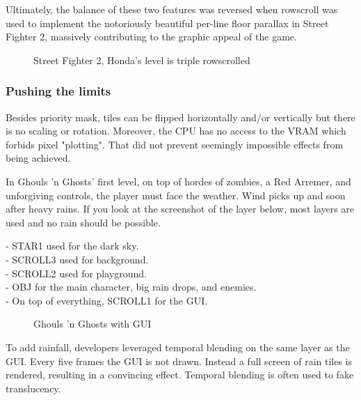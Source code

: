 Ultimately, the balance of these two features was reversed when rowscroll was used to implement the notoriously beautiful per-line floor parallax in Street Fighter 2, massively contributing to the graphic appeal of the game.


\vfill
\begin{figure}[!b]
 \caption*{Street Fighter 2, Honda's level is triple rowscrolled}%
 \end{figure}%
\pagebreak







\subsubsection{Pushing the limits}

Besides priority mask, tiles can be flipped horizontally and/or vertically but there is no scaling or rotation. Moreover, the CPU has no access to the VRAM which forbids pixel "plotting". That did not prevent seemingly impossible effects from being achieved.



In Ghouls 'n Ghosts' first level, on top of hordes of zombies, a Red Arremer, and unforgiving controls, the player must face the weather. Wind picks up and soon after heavy rains. If you look at the screenshot of the layer below, most layers are used and no rain should be possible.

-  STAR1 used for the dark sky.\\
-  SCROLL3 used for background.\\
-  SCROLL2 used for playground.\\
-  OBJ for the main character, big rain drops, and enemies.\\
-  On top of everything, SCROLL1 for the GUI.\\



\vfill
\begin{figure}[!b]
 \caption*{Ghouls 'n Ghosts with GUI}%
 \end{figure}%
\pagebreak

To add rainfall, developers leveraged temporal blending on the same layer as the GUI.\label{gg_rain} Every five frames the GUI is not drawn. Instead a full screen of rain tiles is rendered, resulting in a convincing effect. Temporal blending is often used to fake translucency. 

